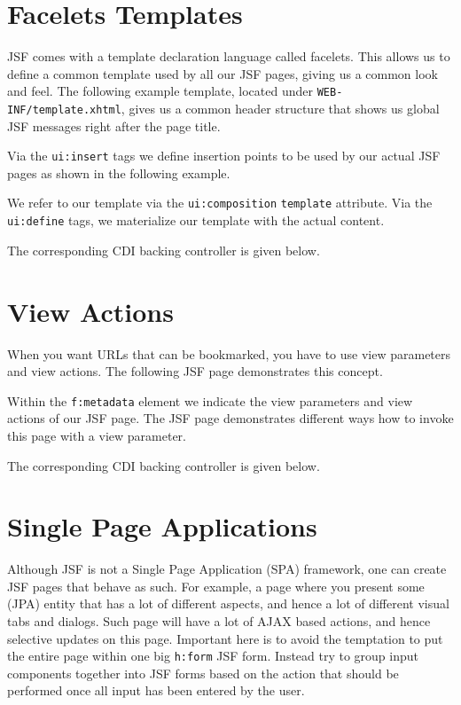 \section{Facelets Templates}
JSF comes with a template declaration language called facelets.
This allows us to define a common template used by all our JSF pages,
giving us a common look and feel.
The following example template, located under \texttt{WEB-INF/template.xhtml},
gives us a common header structure that shows us global JSF messages right after the page title.

Via the \texttt{ui:insert} tags we define insertion points to be used by our actual JSF pages as shown in the following example.

We refer to our template via the \texttt{ui:composition} \texttt{template} attribute.
Via the \texttt{ui:define} tags, we materialize our template with the actual content.

The corresponding CDI backing controller is given below.


\section{View Actions}
When you want URLs that can be bookmarked, you have to use view parameters and view actions.
The following JSF page demonstrates this concept.

Within the \texttt{f:metadata} element we indicate the view parameters and view actions of our JSF page.
The JSF page demonstrates different ways how to invoke this page with a view parameter.

The corresponding CDI backing controller is given below.


\section{Single Page Applications}
Although JSF is not a Single Page Application (SPA) framework, one can create JSF pages that behave as such.
For example, a page where you present some (JPA) entity that has a lot of different aspects, and hence a lot of different visual tabs and dialogs.
Such page will have a lot of AJAX based actions, and hence selective updates on this page.
Important here is to avoid the temptation to put the entire page within one big \texttt{h:form} JSF form.
Instead try to group input components together into JSF forms based on  the action that should be performed once all input has been entered by the user.
